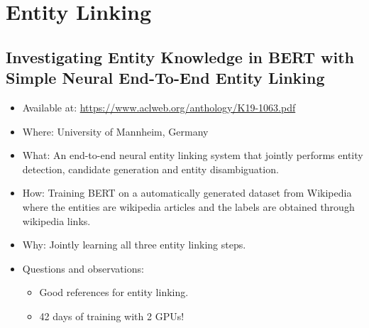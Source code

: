 \documentclass[a4paper,12pt]{article}
\newcommand{\paper}[7]{
    \subsection{#1}
    \begin{itemize}
        \item Available at: #2
        \item Where: #3
        \item What: #4
        \item How: #5
        \item Why: #6
        \item Questions and observations: #7
    \end{itemize}
    }
\begin{document}
\section{Entity Linking}

\paper
{Investigating Entity Knowledge in BERT with Simple Neural End-To-End
Entity Linking}
{\url{https://www.aclweb.org/anthology/K19-1063.pdf}~\cite{bertEL}}
{University of Mannheim, Germany}
{An end-to-end neural entity linking system that jointly performs entity detection, candidate generation and entity disambiguation.}
{Training BERT on a automatically generated dataset from Wikipedia where the entities are wikipedia articles and the labels are obtained through wikipedia links.}
{Jointly learning all three entity linking steps.}
{\begin{itemize}
    \item Good references for entity linking.
    \item 42 days of training with 2 GPUs!
\end{itemize}}




\end{document}
